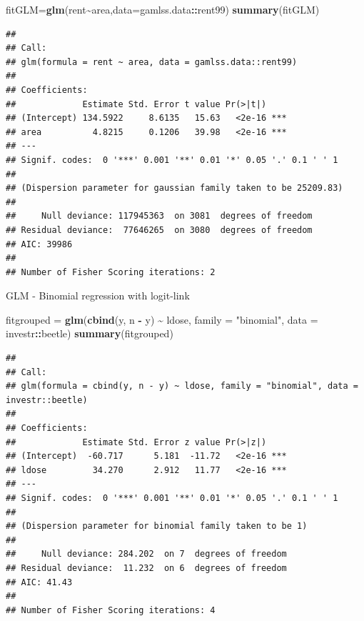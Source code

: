 \documentclass[
  ignorenonframetext,
]{beamer}
\newenvironment{Shaded}{\begin{snugshade}}{\end{snugshade}}
\newcommand{\AttributeTok}[1]{\textcolor[rgb]{0.13,0.29,0.53}{#1}}
\newcommand{\FunctionTok}[1]{\textcolor[rgb]{0.13,0.29,0.53}{\textbf{#1}}}
\newcommand{\NormalTok}[1]{#1}
\newcommand{\OtherTok}[1]{\textcolor[rgb]{0.56,0.35,0.01}{#1}}
\newcommand{\SpecialCharTok}[1]{\textcolor[rgb]{0.81,0.36,0.00}{\textbf{#1}}}
\newcommand{\StringTok}[1]{\textcolor[rgb]{0.31,0.60,0.02}{#1}}
\begin{document}
\begin{frame}[fragile]
\begin{Shaded}
\begin{Highlighting}[]
\NormalTok{fitGLM}\OtherTok{=}\FunctionTok{glm}\NormalTok{(rent}\SpecialCharTok{\textasciitilde{}}\NormalTok{area,}\AttributeTok{data=}\NormalTok{gamlss.data}\SpecialCharTok{::}\NormalTok{rent99)}
\FunctionTok{summary}\NormalTok{(fitGLM)}
\end{Highlighting}
\end{Shaded}

\begin{verbatim}
## 
## Call:
## glm(formula = rent ~ area, data = gamlss.data::rent99)
## 
## Coefficients:
##             Estimate Std. Error t value Pr(>|t|)    
## (Intercept) 134.5922     8.6135   15.63   <2e-16 ***
## area          4.8215     0.1206   39.98   <2e-16 ***
## ---
## Signif. codes:  0 '***' 0.001 '**' 0.01 '*' 0.05 '.' 0.1 ' ' 1
## 
## (Dispersion parameter for gaussian family taken to be 25209.83)
## 
##     Null deviance: 117945363  on 3081  degrees of freedom
## Residual deviance:  77646265  on 3080  degrees of freedom
## AIC: 39986
## 
## Number of Fisher Scoring iterations: 2
\end{verbatim}
\end{frame}

\begin{frame}[fragile]
\begin{block}{GLM - Binomial regression with logit-link}
\protect\hypertarget{glm---binomial-regression-with-logit-link}{}
\begin{Shaded}
\begin{Highlighting}[]
\NormalTok{fitgrouped }\OtherTok{=} \FunctionTok{glm}\NormalTok{(}\FunctionTok{cbind}\NormalTok{(y, n }\SpecialCharTok{{-}}\NormalTok{ y) }\SpecialCharTok{\textasciitilde{}}\NormalTok{ ldose, }\AttributeTok{family =} \StringTok{"binomial"}\NormalTok{, }\AttributeTok{data =}\NormalTok{ investr}\SpecialCharTok{::}\NormalTok{beetle)}
\FunctionTok{summary}\NormalTok{(fitgrouped)}
\end{Highlighting}
\end{Shaded}

\begin{verbatim}
## 
## Call:
## glm(formula = cbind(y, n - y) ~ ldose, family = "binomial", data = investr::beetle)
## 
## Coefficients:
##             Estimate Std. Error z value Pr(>|z|)    
## (Intercept)  -60.717      5.181  -11.72   <2e-16 ***
## ldose         34.270      2.912   11.77   <2e-16 ***
## ---
## Signif. codes:  0 '***' 0.001 '**' 0.01 '*' 0.05 '.' 0.1 ' ' 1
## 
## (Dispersion parameter for binomial family taken to be 1)
## 
##     Null deviance: 284.202  on 7  degrees of freedom
## Residual deviance:  11.232  on 6  degrees of freedom
## AIC: 41.43
## 
## Number of Fisher Scoring iterations: 4
\end{verbatim}
\end{block}
\end{frame}
\end{document}
